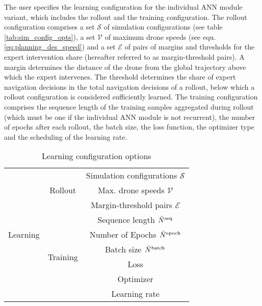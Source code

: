 The user specifies the learning configuration
for the individual ANN module variant, 
which includes the rollout and the training configuration.
The rollout configuration comprises 
a set $\mathcal{S}$ of simulation configurations 
(see table \ref{tab:sim_config_opts}),
a set $\mathcal{V}$ of maximum drone speeds 
(see equ. \ref{eq:planning_des_speed})
and a set $\mathcal{E}$ of pairs of 
margins and thresholds for the expert intervention share
(hereafter referred to as margin-threshold pairs).
A margin determines the
distance of the drone from the global trajectory
above which the expert intervenes.
The threshold determines 
the share of expert navigation decisions 
in the total navigation decisions of a rollout, 
below which a rollout configuration is considered sufficiently learned.
The training configuration comprises 
the sequence length of the training samples aggregated during rollout
(which must be one if the individual ANN module is not recurrent),
the number of epochs after each rollout,
the batch size,
the loss function,
the optimizer type and the scheduling of the learning rate.
\begin{table}[h]
    \caption{Learning configuration options
    \label{tab:learn_config}}
    \centering
    \begin{tabular}{|c|c|c|} 
        \hline
        \multirow{9}{*}{Learning} 
        &\multirow{3}{*}{Rollout}   
        &Simulation configurations $\mathcal{S}$
        \\\cline{3-3}
        &
        &Max. drone speeds $\mathcal{V}$
        \\\cline{3-3}
        &
        &Margin-threshold pairs $\mathcal{E}$
        \\\cline{2-3}
        &\multirow{6}{*}{Training}   
        &Sequence length $\seqLen$
        \\\cline{3-3}
        &
        &Number of Epochs $\num[\user]{\text{epoch}}{}{}{}$
        \\\cline{3-3}
        &
        &Batch size $\batchSize$
        \\\cline{3-3}
        &
        &Loss
        \\\cline{3-3}
        &
        &Optimizer
        \\\cline{3-3}
        &
        &Learning rate
        \\\hline
    \end{tabular}
\end{table}


